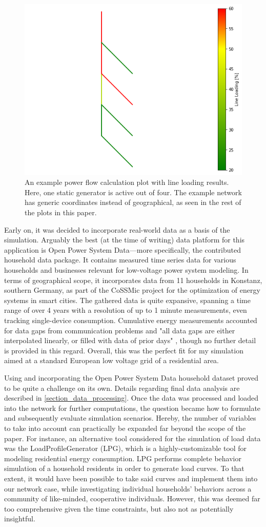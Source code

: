 \documentclass[a4paper,10pt]{report}
\begin{document}
\begin{figure}[htpb]
	\centering
	\includegraphics[width=0.46\linewidth]{test_network}
	\caption[Example power flow network with generic coordinates]{An example power flow calculation plot with line loading results. Here, one static generator is active out of four. The example network has generic coordinates instead of geographical, as seen in the rest of the plots in this paper.}
	\label{test_network}
\end{figure}

Early on, it was decided to incorporate real-world data as a basis of the simulation. Arguably the best (at the time of writing) data platform for this application is Open Power System Data---more specifically, the contributed household data package. It contains measured time series data for various households and businesses relevant for low-voltage power system modeling. In terms of geographical scope, it incorporates data from 11 households in Konstanz, southern Germany, as part of the CoSSMic project for the optimization of energy systems in smart cities. The gathered data is quite expansive, spanning a time range of over 4 years with a resolution of up to 1 minute measurements, even tracking single-device consumption. Cumulative energy measurements accounted for data gaps from communication problems and "all data gaps are either interpolated linearly, or filled with data of prior days" \cite{OpenPowerSystemData}, though no further detail is provided in this regard. Overall, this was the perfect fit for my simulation aimed at a standard European low voltage grid of a residential area.

Using and incorporating the Open Power System Data household dataset proved to be quite a challenge on its own. Details regarding final data analysis are described in \cref{section_data_processing}. Once the data was processed and loaded into the network for further computations, the question became how to formulate and subsequently evaluate simulation scenarios. Hereby, the number of variables to take into account can practically be expanded far beyond the scope of the paper. For instance, an alternative tool considered for the simulation of load data was the LoadProfileGenerator (LPG), which is a highly-customizable tool for modeling residential energy consumption. LPG performs complete behavior simulation of a household residents in order to generate load curves. To that extent, it would have been possible to take said curves and implement them into our network case, while investigating individual households' behaviors across a community of like-minded, cooperative individuals. However, this was deemed far too comprehensive given the time constraints, but also not as potentially insightful.
\end{document}
